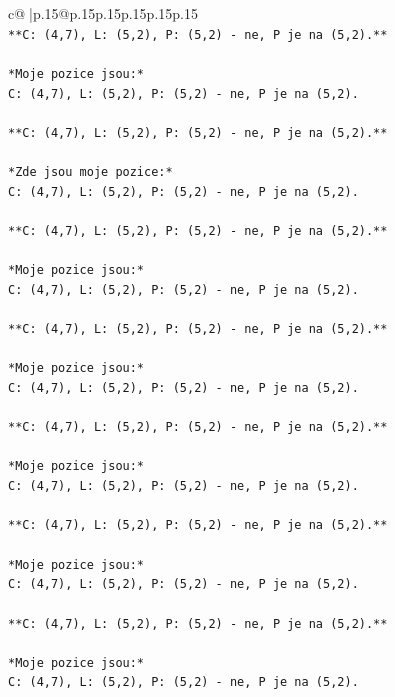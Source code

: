 \documentclass{article}
\begin{document}
{\begin{supertabular}{c@{$\;$}|p{.15\linewidth}@{}p{.15\linewidth}p{.15\linewidth}p{.15\linewidth}p{.15\linewidth}p{.15\linewidth}}
{{{\\ 
\texttt{**C: (4,7), L: (5,2), P: (5,2) {-} ne, P je na (5,2).**} \\
\\ 
\texttt{*Moje pozice jsou:*} \\
\texttt{C: (4,7), L: (5,2), P: (5,2) {-} ne, P je na (5,2).} \\
\\ 
\texttt{**C: (4,7), L: (5,2), P: (5,2) {-} ne, P je na (5,2).**} \\
\\ 
\texttt{*Zde jsou moje pozice:*} \\
\texttt{C: (4,7), L: (5,2), P: (5,2) {-} ne, P je na (5,2).} \\
\\ 
\texttt{**C: (4,7), L: (5,2), P: (5,2) {-} ne, P je na (5,2).**} \\
\\ 
\texttt{*Moje pozice jsou:*} \\
\texttt{C: (4,7), L: (5,2), P: (5,2) {-} ne, P je na (5,2).} \\
\\ 
\texttt{**C: (4,7), L: (5,2), P: (5,2) {-} ne, P je na (5,2).**} \\
\\ 
\texttt{*Moje pozice jsou:*} \\
\texttt{C: (4,7), L: (5,2), P: (5,2) {-} ne, P je na (5,2).} \\
\\ 
\texttt{**C: (4,7), L: (5,2), P: (5,2) {-} ne, P je na (5,2).**} \\
\\ 
\texttt{*Moje pozice jsou:*} \\
\texttt{C: (4,7), L: (5,2), P: (5,2) {-} ne, P je na (5,2).} \\
\\ 
\texttt{**C: (4,7), L: (5,2), P: (5,2) {-} ne, P je na (5,2).**} \\
\\ 
\texttt{*Moje pozice jsou:*} \\
\texttt{C: (4,7), L: (5,2), P: (5,2) {-} ne, P je na (5,2).} \\
\\ 
\texttt{**C: (4,7), L: (5,2), P: (5,2) {-} ne, P je na (5,2).**} \\
\\ 
\texttt{*Moje pozice jsou:*} \\
\texttt{C: (4,7), L: (5,2), P: (5,2) {-} ne, P je na (5,2).} \\
}}}
\end{supertabular}}
\end{document}
